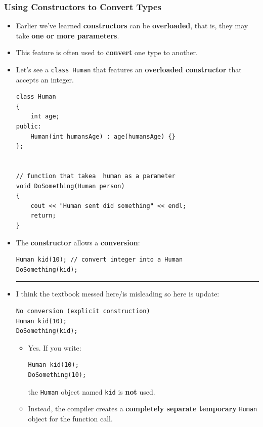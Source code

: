 \documentclass[10pt]{article}
\newcommand{\myhrule}[1]{%
  \vspace{#1}%
  \noindent\hrule
  \vspace{#1}%
}
\begin{document}
\subsubsection{Using Constructors to Convert Types}
\begin{itemize}
	\item Earlier we've learned \textbf{constructors} can be \textbf{overloaded}, that is, they may take \textbf{one or more parameters}.

	\item This feature is often used to \textbf{convert} one type to another.

	\item Let's see a \verb|class Human| that features an \textbf{overloaded constructor} that accepts an integer.

		\begin{verbatim}
class Human
{
	int age;
public:
	Human(int humansAge) : age(humansAge) {}
};


// function that takea  human as a parameter
void DoSomething(Human person)
{
	cout << "Human sent did something" << endl;
	return;
}
		\end{verbatim}

	\item The \textbf{constructor} allows a \textbf{conversion}:

	\begin{verbatim}
Human kid(10); // convert integer into a Human
DoSomething(kid);
	\end{verbatim}


\myhrule{1em}

\item I think the textbook messed here/is misleading so here is update:
\begin{verbatim}
No conversion (explicit construction)
Human kid(10);
DoSomething(kid);
\end{verbatim}

\begin{itemize}
    \item Yes. If you write:

\begin{verbatim}
Human kid(10);
DoSomething(10);
\end{verbatim}

    the \verb|Human| object named \verb|kid| is \textbf{not} used.

    \item Instead, the compiler creates a \textbf{completely separate temporary} \verb|Human|
    object for the function call.


\end{itemize}
\end{itemize}
\end{document}
